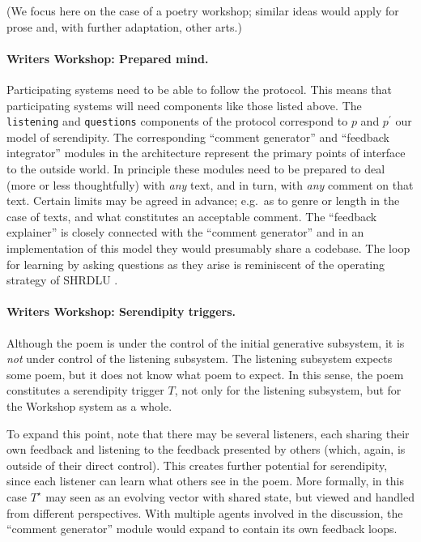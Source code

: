 \bigskip

\noindent (We focus here on the case of a poetry workshop; similar
ideas would apply for prose and, with further adaptation, other arts.)

\paragraph{Writers Workshop: Prepared mind.}
Participating systems need to be able to follow the protocol.  This
means that participating systems will need components like those
listed above. The {\tt listening} and {\tt questions} components of
the protocol correspond to $p$ and $p^{\prime}$ our model of
serendipity.  The corresponding ``comment generator'' and ``feedback
integrator'' modules in the architecture represent the primary points
of interface to the outside world.  In principle these modules need to
be prepared to deal (more or less thoughtfully) with \emph{any} text,
and in turn, with \emph{any} comment on that text.  Certain limits may
be agreed in advance; e.g.~as to genre or length in the case of texts,
and what constitutes an acceptable comment.  The ``feedback
explainer'' is closely connected with the ``comment generator'' and in
an implementation of this model they would presumably share a
codebase.  The loop for learning by asking questions as they arise is
reminiscent of the operating strategy of {\sf SHRDLU}
\cite{winograd1972understanding}.

\paragraph{Writers Workshop: Serendipity triggers.}

Although the poem is under the control of the initial generative
subsystem, it is \emph{not} under control of the listening subsystem.
The listening subsystem expects some poem, but it does not know what
poem to expect.  In this sense, the poem constitutes a serendipity
trigger $T$, not only for the listening subsystem, but for the
Workshop system as a whole.

To expand this point, note that there may be several listeners, each
sharing their own feedback and listening to the feedback presented by
others (which, again, is outside of their direct control).  This
creates further potential for serendipity, since each listener can
learn what others see in the poem.  More formally, in this case
$T^\star$ may seen as an evolving vector with shared state, but viewed
and handled from different perspectives.  With multiple agents
involved in the discussion, the ``comment generator'' module would
expand to contain its own feedback loops.

